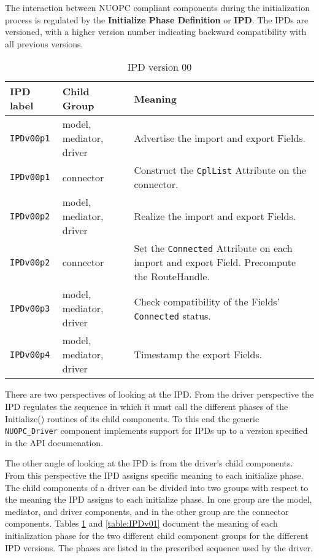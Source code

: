 %

\label{IPD}

The interaction between NUOPC compliant components during the initialization process is regulated by the {\bf Initialize Phase Definition} or {\bf IPD}. The IPDs are versioned, with a higher version number indicating backward compatibility with all previous versions.

\begin{table}[h]
\begin{tabular}{|p{5cm}|p{5cm}|p{35mm}|}
     \hline\hline
     {\bf IPD label} & {\bf Child Group} & {\bf Meaning}\\
     \hline\hline
     {\tt IPDv00p1} & model, mediator, driver & Advertise the import and export Fields.\\ \hline
     {\tt IPDv00p1} & connector               & Construct the {\tt CplList} Attribute on the connector.\\ \hline
     {\tt IPDv00p2} & model, mediator, driver & Realize the import and export Fields.\\ \hline
     {\tt IPDv00p2} & connector               & Set the {\tt Connected} Attribute on each import and export Field. Precompute the RouteHandle.\\ \hline
     {\tt IPDv00p3} & model, mediator, driver & Check compatibility of the Fields' {\tt Connected} status.\\ \hline
     {\tt IPDv00p4} & model, mediator, driver & Timestamp the export Fields.\\
     \hline\hline
\end{tabular}
\caption{IPD version 00}
\label{table:IPDv00}
\end{table}

There are two perspectives of looking at the IPD. From the driver perspective the IPD regulates the sequence in which it must call the different phases of the Initialize() routines of its child components. To this end the generic {\tt NUOPC\_Driver} component implements support for IPDs up to a version specified in the API documenation.

The other angle of looking at the IPD is from the driver's child components. From this perspective the IPD assigns specific meaning to each initialize phase. The child components of a driver can be divided into two groups with respect to the meaning the IPD assigns to each initialize phase. In one group are the model, mediator, and driver components, and in the other group are the connector components. Tables \ref{table:IPDv00} and \ref{table:IPDv01} document the meaning of each initialization phase for the two different child component groups for the different IPD versions. The phases are listed in the prescribed sequence used by the driver.

